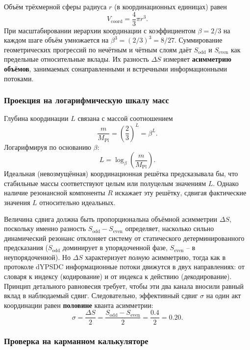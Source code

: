 \documentclass[12pt,a4paper]{article}
\begin{document}
	Объём трёхмерной сферы радиуса \(r\) (в координационных единицах) равен
	\[
	V_{\text{coord}} = \frac{4}{3}\pi r^3.
	\]
	При масштабировании иерархии координации с коэффициентом \(\beta = 2/3\) на каждом шаге объём умножается на \(\beta^3 = (2/3)^3 = 8/27\). Суммирование геометрических прогрессий по нечётным и чётным слоям даёт \(S_{\mathrm{odd}}\) и \(S_{\mathrm{even}}\) как предельные относительные вклады. Их разность \(\Delta S\) измеряет \textbf{асимметрию объёмов}, занимаемых сонаправленными и встречными информационными потоками.
	
	\subsubsection{Проекция на логарифмическую шкалу масс}
	
	Глубина координации \(L\) связана с массой соотношением
	\[
	\frac{m}{M_{\mathrm{Pl}}} = \left(\frac{2}{3}\right)^L = \beta^L.
	\]
	Логарифмируя по основанию \(\beta\):
	\[
	L = \log_{\beta}\left(\frac{m}{M_{\mathrm{Pl}}}\right).
	\]
	Идеальная (невозмущённая) координационная решётка предсказывала бы, что стабильные массы соответствуют целым или полуцелым значениям \(L\). Однако наличие резонансной компоненты \(R\) искажает эту решётку, сдвигая фактические значения \(L\) относительно идеальных.
	
	Величина сдвига должна быть пропорциональна объёмной асимметрии \(\Delta S\), поскольку именно разность \(S_{\mathrm{odd}} - S_{\mathrm{even}}\) определяет, насколько сильно динамический резонанс отклоняет систему от статического детерминированного предсказания (\(S_{\mathrm{odd}}\) доминирует в упорядоченной фазе, \(S_{\mathrm{even}}\) -- в неупорядоченной). Но \(\Delta S\) характеризует \textit{полную} асимметрию, тогда как в протоколе dYPSDC информационные потоки движутся в двух направлениях: от словаря к индексу (кодирование) и от индекса к действию (декодирование). Принцип детального равновесия требует, чтобы эти два канала вносили равный вклад в наблюдаемый сдвиг. Следовательно, эффективный сдвиг \(\sigma\) на один акт координации равен \textbf{половине} кванта асимметрии:
	\begin{equation}
		\boxed{\sigma = \frac{\Delta S}{2} = \frac{S_{\mathrm{odd}} - S_{\mathrm{even}}}{2} = \frac{0.4}{2} = 0.20.}
		\label{eq:sigma_final}
	\end{equation}
	
	\subsubsection{Проверка на карманном калькуляторе}
	
\end{document}
